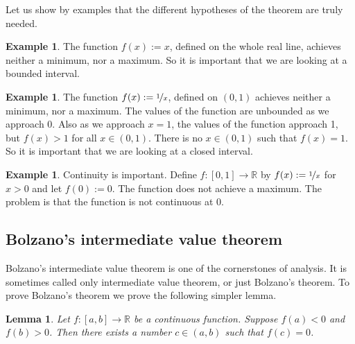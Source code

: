 \documentclass[12pt]{book}
\newcommand{\R}{{\mathbb{R}}}
\theoremstyle{plain}
\newtheorem{lemma}[thm]{Lemma}
\theoremstyle{remark}
\theoremstyle{definition}
\theoremstyle{exercise}
\theoremstyle{example}
\newtheorem{example}[thm]{Example}
\begin{document}
Let us show by examples that the different hypotheses of the theorem are
truly needed.

\begin{example}
The function $f(x) := x$, defined on the whole real line,
achieves neither a minimum, nor a maximum.  So it is important that
we are looking at a bounded interval.
\end{example}

\begin{example}
The function $f(x) := \nicefrac{1}{x}$, defined on $(0,1)$ 
achieves neither a minimum, nor a maximum.  The values of the function are
unbounded as we approach 0.  Also as we approach $x=1$, the values of the
function approach 1, but $f(x) > 1$ for all $x \in (0,1)$.  There is
no $x \in (0,1)$ such that $f(x) = 1$.  So it is important that
we are looking at a closed interval.
\end{example}

\begin{example}
Continuity is important.
Define $f \colon [0,1] \to \R$ by 
$f(x) := \nicefrac{1}{x}$ for $x > 0$ and let $f(0) := 0$.
The function does not achieve a maximum.  The problem is that
the function is not continuous at 0.
\end{example}

\subsection{Bolzano's intermediate value theorem}

Bolzano's intermediate value theorem is one of the cornerstones of analysis.
It is sometimes called only intermediate value theorem, or just
Bolzano's theorem.  To prove Bolzano's theorem we prove the
following simpler lemma.

\begin{lemma} \label{IVT:lemma}
Let $f \colon [a,b] \to \R$ be a continuous function.
Suppose $f(a) < 0$ and $f(b) > 0$. 
Then there exists a number $c \in (a,b)$
such that $f(c) = 0$.
\end{lemma}
\end{document}
